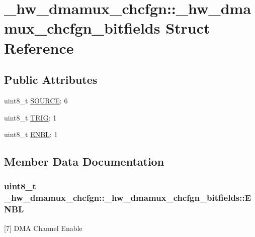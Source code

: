 \hypertarget{struct__hw__dmamux__chcfgn_1_1__hw__dmamux__chcfgn__bitfields}{}\section{\+\_\+hw\+\_\+dmamux\+\_\+chcfgn\+:\+:\+\_\+hw\+\_\+dmamux\+\_\+chcfgn\+\_\+bitfields Struct Reference}
\label{struct__hw__dmamux__chcfgn_1_1__hw__dmamux__chcfgn__bitfields}
\subsection*{Public Attributes}
\begin{DoxyCompactItemize}
\item 
uint8\+\_\+t \hyperlink{struct__hw__dmamux__chcfgn_1_1__hw__dmamux__chcfgn__bitfields_a94410b3b8e61c9d344b0ac16a1581bdd}{S\+O\+U\+R\+CE}\+: 6
\item 
uint8\+\_\+t \hyperlink{struct__hw__dmamux__chcfgn_1_1__hw__dmamux__chcfgn__bitfields_a996a467955917bbdc0eaa4a4f4d4c189}{T\+R\+IG}\+: 1
\item 
uint8\+\_\+t \hyperlink{struct__hw__dmamux__chcfgn_1_1__hw__dmamux__chcfgn__bitfields_a4cc5d37b335399090b11d81d961a9751}{E\+N\+BL}\+: 1
\end{DoxyCompactItemize}


\subsection{Member Data Documentation}
\subsubsection[{\texorpdfstring{E\+N\+BL}{ENBL}}]{\setlength{\rightskip}{0pt plus 5cm}uint8\+\_\+t \+\_\+hw\+\_\+dmamux\+\_\+chcfgn\+::\+\_\+hw\+\_\+dmamux\+\_\+chcfgn\+\_\+bitfields\+::\+E\+N\+BL}\hypertarget{struct__hw__dmamux__chcfgn_1_1__hw__dmamux__chcfgn__bitfields_a4cc5d37b335399090b11d81d961a9751}{}\label{struct__hw__dmamux__chcfgn_1_1__hw__dmamux__chcfgn__bitfields_a4cc5d37b335399090b11d81d961a9751}
\mbox{[}7\mbox{]} D\+MA Channel Enable 
